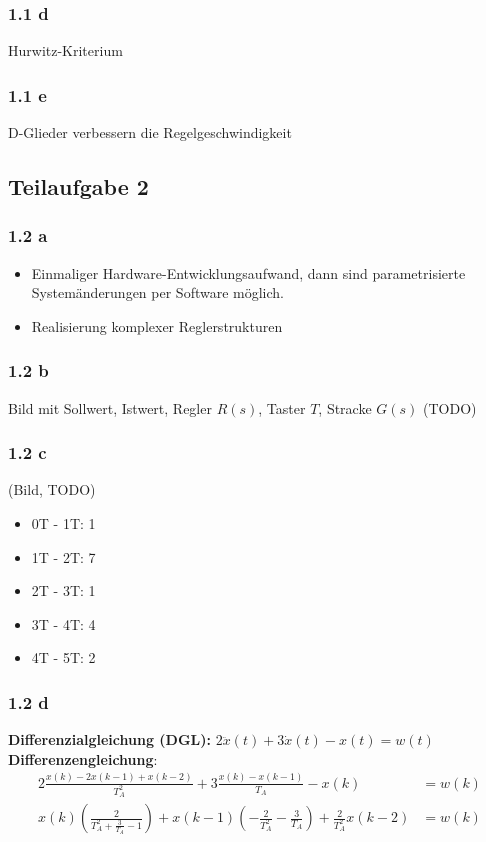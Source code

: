 \documentclass[a4paper]{scrartcl}
\begin{document}
  \subsubsection*{1.1 d}
  Hurwitz-Kriterium

  \subsubsection*{1.1 e}
  D-Glieder verbessern die Regelgeschwindigkeit

  \subsection*{Teilaufgabe 2}
  \subsubsection*{1.2 a}
  \begin{itemize}
      \item Einmaliger Hardware-Entwicklungsaufwand, dann sind parametrisierte
            Systemänderungen per Software möglich.
      \item Realisierung komplexer Reglerstrukturen
  \end{itemize}

  \subsubsection*{1.2 b}
  Bild mit Sollwert, Istwert, Regler $R(s)$, Taster $T$, Stracke $G(s)$
  (TODO)

  \subsubsection*{1.2 c}
  (Bild, TODO)

  \begin{itemize}
      \item 0T - 1T: 1
      \item 1T - 2T: 7
      \item 2T - 3T: 1
      \item 3T - 4T: 4
      \item 4T - 5T: 2
  \end{itemize}


  \subsubsection*{1.2 d}
  \textbf{Differenzialgleichung (DGL):} $2 \ddot{x}(t) + 3 \dot{x}(t) - x(t) = w(t)$\\
  \textbf{Differenzengleichung}:
  \begin{align}
      2 \frac{x(k) - 2x(k-1) + x(k-2)}{T_A^2} + 3 \frac{x(k) - x(k-1)}{T_A} - x(k) &= w(k)\\
      x(k) (\frac{2}{T_A^2 + \frac{3}{T_A} - 1}) + x(k-1)(-\frac{2}{T_A^2} - \frac{3}{T_A}) + \frac{2}{T_A^2} x(k-2) &= w(k)
  \end{align}
\end{document}
